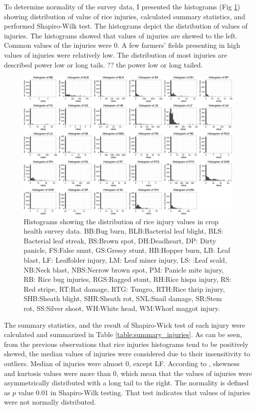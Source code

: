 To determine normality of the survey data, I presented the histograms (Fig \ref{fig:allhisto}) showing distribution of value of rice injuries, calculated summary statistics, and performed Shapiro-Wilk test. The histograms depict the distribution of values of injuries. The histograms showed that values of injuries are skewed to the left. Common values of the injuries were 0. A few farmers’ fields presenting in high values of injuries were relatively low. The distribution of most injuries are described power low or long tails. ?? the power low or long tailed.

\begin{landscape}
\begin{figure}[!h]
\centering
\includegraphics[height = 1\textheight]{figures/allhisto2/allhisto2.png}
\caption{Histograms showing the distribution of rice injury values in crop health survey data. BB:Bug burn, BLB:Bacterial leaf blight, BLS: Bacterial leaf streak, BS:Brown spot, DH:Deadheart, DP: Dirty panicle, FS:False smut, GS:Gressy stunt, HB:Hopper burn, LB: Leaf blast, LF: Leaffolder injury, LM: Leaf miner injury, LS: :Leaf scald, NB:Neck blast, NBS:Nerrow brown spot, PM: Panicle mite injury, RB: Rice bug injuries, RGS:Ragged stunt, RH:Rice hispa injury, RS: Red stripe, RT:Rat damage, RTG: Tungro, RTH:Rice thrip injury, SHB:Sheath blight, SHR:Sheath rot, SNL:Snail damage, SR:Stem rot, SS:Silver shoot, WH:White head, WM:Whorl maggot injury.}
\label{fig:allhisto}
\end{figure}
\end{landscape}



The summary statistics, and the result of Shapiro-Wick test of each injury were calculated and summarized in Table \ref{table:summary_injuries}. As can be seen, from the previous observations that rice injuries histograms tend to be positively skewed, the median values of injuries were considered due to their insensitivity to outliers. Median of injuries were almost 0, except LF. According to \citet{Doane_2011_Measuring}, skewness and kurtosis values were more than 0, which mean that the values of injuries were asymmetrically distributed with a long tail to the right. The normality is defined as $p$ value 0.01 in Shapiro-Wilk testing. That test indicates that values of injuries were not normally distributed.

